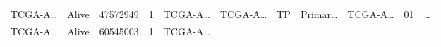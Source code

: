 \documentclass[
]{article}
\begin{document}
\begin{longtable}[]{@{}lllllllllll@{}}
\begin{minipage}[t]{0.07\columnwidth}
TCGA-A\ldots{}\strut
\end{minipage} & \begin{minipage}[t]{0.04\columnwidth}\raggedright
Alive\strut
\end{minipage} & \begin{minipage}[t]{0.06\columnwidth}\raggedright
47572949\strut
\end{minipage} & \begin{minipage}[t]{0.07\columnwidth}\raggedright
1\strut
\end{minipage} & \begin{minipage}[t]{0.07\columnwidth}\raggedright
TCGA-A\ldots{}\strut
\end{minipage} & \begin{minipage}[t]{0.07\columnwidth}\raggedright
TCGA-A\ldots{}\strut
\end{minipage} & \begin{minipage}[t]{0.07\columnwidth}\raggedright
TP\strut
\end{minipage} & \begin{minipage}[t]{0.07\columnwidth}\raggedright
Primar\ldots{}\strut
\end{minipage} & \begin{minipage}[t]{0.09\columnwidth}\raggedright
TCGA-A\ldots{}\strut
\end{minipage} & \begin{minipage}[t]{0.10\columnwidth}\raggedright
01\strut
\end{minipage} & \begin{minipage}[t]{0.03\columnwidth}\raggedright
\ldots{}\strut
\end{minipage}\tabularnewline
\begin{minipage}[t]{0.07\columnwidth}\raggedright
TCGA-A\ldots{}\strut
\end{minipage} & \begin{minipage}[t]{0.04\columnwidth}\raggedright
Alive\strut
\end{minipage} & \begin{minipage}[t]{0.06\columnwidth}\raggedright
60545003\strut
\end{minipage} & \begin{minipage}[t]{0.07\columnwidth}\raggedright
1\strut
\end{minipage} & \begin{minipage}[t]{0.07\columnwidth}\raggedright
TCGA-A\ldots{}\strut
\end{minipage} & \begin{minipage}[t]{0.07\columnwidth}\raggedright

\end{minipage}
\end{longtable}
\end{document}
